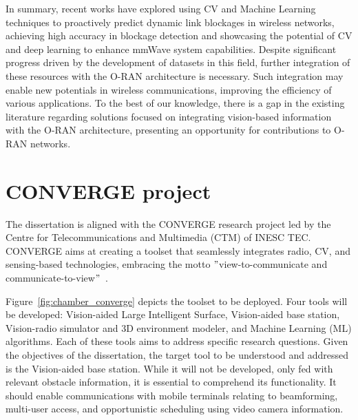 In summary, recent works have explored using CV and Machine Learning techniques to proactively predict dynamic link blockages in wireless networks, achieving high accuracy in blockage detection and showcasing the potential of CV and deep learning to enhance mmWave system capabilities.
Despite significant progress driven by the development of datasets in this field, further integration of these resources with the O-RAN architecture is necessary.
Such integration may enable new potentials in wireless communications, improving the efficiency of various applications.
To the best of our knowledge, there is a gap in the existing literature regarding solutions focused on integrating vision-based information with the O-RAN architecture, presenting an opportunity for contributions to O-RAN networks.



\section{CONVERGE project}\label{sec:CONVERGE}

The dissertation is aligned with the CONVERGE research project led by the Centre for
Telecommunications and Multimedia (CTM) of INESC TEC. CONVERGE aims at creating a
toolset that seamlessly integrates radio, CV, and sensing-based technologies,
embracing the motto \("\)view-to-communicate and communicate-to-view\("\)~\cite{converge_site}.

Figure~\ref{fig:chamber_converge} depicts the toolset to be deployed.
Four tools will be developed: Vision-aided Large Intelligent Surface, Vision-aided base station, Vision-radio simulator and 3D environment modeler, and Machine Learning (ML) algorithms.
Each of these tools aims to address specific research questions.
Given the objectives of the dissertation, the target tool to be understood and addressed is the Vision-aided base station.
While it will not be developed, only fed with relevant obstacle information, it is essential to comprehend its functionality.
It should enable communications with mobile terminals relating to beamforming, multi-user access, and opportunistic scheduling using video camera information.

